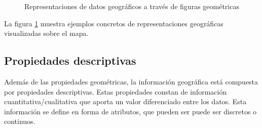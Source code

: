 \begin{figure}[H]
  \centering
  \caption{Representaciones de datos geográficos a través de figuras geométricas} \label{fig:dimensiones} 
\end{figure} 

La figura \ref{fig:dimensiones} muestra ejemplos concretos de representaciones geográficas visualizadas sobre el mapa.

\subsection{Propiedades descriptivas}

Además de las propiedades geométricas, la información geográfica está compuesta por propiedades descriptivas.
Estas propiedades constan de información cuantitativa/cualitativa que aporta un valor diferenciado entre los datos.
Esta información se define en forma de atributos, que pueden ser puede ser discretos o continuos.

